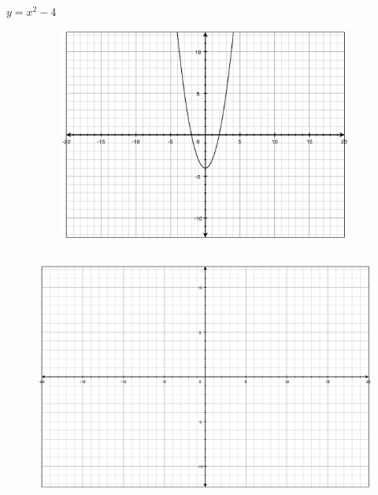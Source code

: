 \documentclass[fleqn,addpoints]{exam}
\begin{document}
\begin{questions}
\question[5] \( y = x^2 - 4\)
\label{graph:last}
\begin{figure}[H]
\ifprintanswers
  \includegraphics[width=12cm,height=7cm]{problem3}
\else
  \includegraphics[width=15cm,height=9cm]{axes}
\fi
\end{figure}

\pagebreak


\end{questions}
\end{document}
